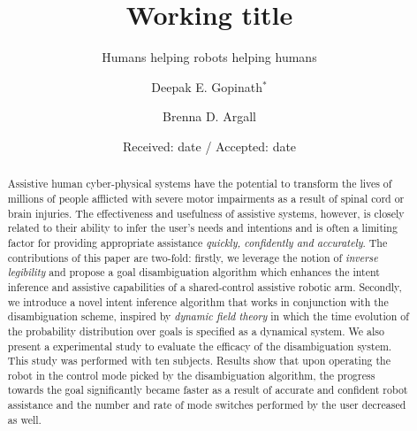\title{Working title%
}
\subtitle{Humans helping robots helping humans}


\author{Deepak E. Gopinath$^*$      \and
        Brenna D. Argall %
}



\date{Received: date / Accepted: date}


\maketitle

\begin{abstract}
Assistive human cyber-physical systems have the potential to transform the lives of millions of people afflicted with severe motor impairments as a result of spinal cord or brain injuries. The effectiveness and usefulness of assistive systems, however, is closely related to their ability to infer the user's needs and intentions and is often a limiting factor for providing appropriate assistance \textit{quickly, confidently and accurately}. The contributions of this paper are two-fold: firstly, we leverage the notion of \textit{inverse legibility} and propose a goal disambiguation algorithm which enhances the intent inference and assistive capabilities of a shared-control assistive robotic arm. Secondly, we introduce a novel intent inference algorithm that works in conjunction with the disambiguation scheme, inspired by \textit{dynamic field theory} in which the time evolution of the probability distribution over goals is specified as a dynamical system. We also present a experimental study to evaluate the efficacy of the disambiguation system. This study was performed with ten subjects. Results show that upon operating the robot in the control mode picked by the disambiguation algorithm, the progress towards the goal significantly became faster as a result of accurate and confident robot assistance and the number and rate of mode switches performed by the user decreased as well. 
\end{abstract}

